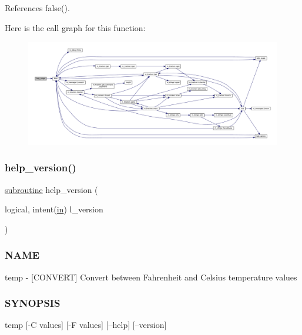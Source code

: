 References false().

Here is the call graph for this function\+:
\nopagebreak
\begin{figure}[H]
\begin{center}
\leavevmode
\includegraphics[width=350pt]{temp_8f90_a3e09a3b52ee8fb04eeb93fe5761626a8_cgraph}
\end{center}
\end{figure}
\mbox{\label{temp_8f90_a39c21619b08a3c22f19e2306efd7f766}} 
\subsubsection{\texorpdfstring{help\+\_\+version()}{help\_version()}}
{\footnotesize\ttfamily \hyperlink{M__stopwatch_83_8txt_acfbcff50169d691ff02d4a123ed70482}{subroutine} help\+\_\+version (\begin{DoxyParamCaption}\item[{logical, intent(\hyperlink{M__journal_83_8txt_afce72651d1eed785a2132bee863b2f38}{in})}]{l\+\_\+version }\end{DoxyParamCaption})}



\subsubsection*{N\+A\+ME}

temp -\/ \mbox{[}C\+O\+N\+V\+E\+RT\mbox{]} Convert between Fahrenheit and Celsius temperature values 

\subsubsection*{S\+Y\+N\+O\+P\+S\+IS}

\begin{DoxyVerb}temp [-C values] [-F values] [--help] [--version]
\end{DoxyVerb}


